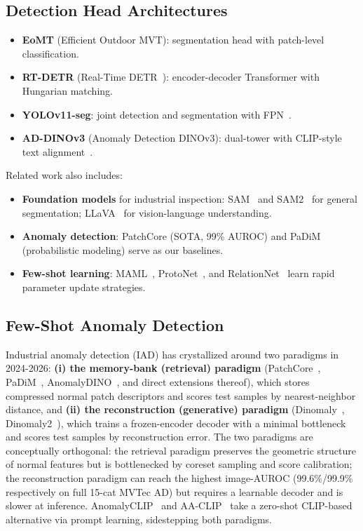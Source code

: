 \documentclass[journal]{IEEEtran}
\begin{document}
\subsection{Detection Head Architectures}
\begin{itemize}\itemsep0pt
    \item \textbf{EoMT} (Efficient Outdoor MVT): segmentation head with patch-level classification.
    \item \textbf{RT-DETR} (Real-Time DETR~\cite{ref15}): encoder-decoder Transformer with Hungarian matching.
    \item \textbf{YOLOv11-seg}: joint detection and segmentation with FPN~\cite{ref45}.
    \item \textbf{AD-DINOv3} (Anomaly Detection DINOv3): dual-tower with CLIP-style text alignment~\cite{ref32}.
\end{itemize}

Related work also includes:
\begin{itemize}\itemsep0pt
    \item \textbf{Foundation models} for industrial inspection: SAM~\cite{ref20} and SAM2~\cite{ref21} for general segmentation; LLaVA~\cite{ref34} for vision-language understanding.
    \item \textbf{Anomaly detection}: PatchCore (SOTA, 99\% AUROC) and PaDiM (probabilistic modeling) serve as our baselines.
    \item \textbf{Few-shot learning}: MAML~\cite{ref16}, ProtoNet~\cite{ref17}, and RelationNet~\cite{ref18} learn rapid parameter update strategies.
\end{itemize}

\subsection{Few-Shot Anomaly Detection}
Industrial anomaly detection (IAD) has crystallized around two paradigms in 2024-2026: \textbf{(i) the memory-bank (retrieval) paradigm} (PatchCore~\cite{ref41}, PaDiM~\cite{ref42}, AnomalyDINO~\cite{ref46}, and direct extensions thereof), which stores compressed normal patch descriptors and scores test samples by nearest-neighbor distance, and \textbf{(ii) the reconstruction (generative) paradigm} (Dinomaly~\cite{ref47}, Dinomaly2~\cite{ref48}), which trains a frozen-encoder decoder with a minimal bottleneck and scores test samples by reconstruction error. The two paradigms are conceptually orthogonal: the retrieval paradigm preserves the geometric structure of normal features but is bottlenecked by coreset sampling and score calibration; the reconstruction paradigm can reach the highest image-AUROC (99.6\%/99.9\% respectively on full 15-cat MVTec AD) but requires a learnable decoder and is slower at inference. AnomalyCLIP~\cite{ref33} and AA-CLIP~\cite{ref51} take a zero-shot CLIP-based alternative via prompt learning, sidestepping both paradigms.
\end{document}
